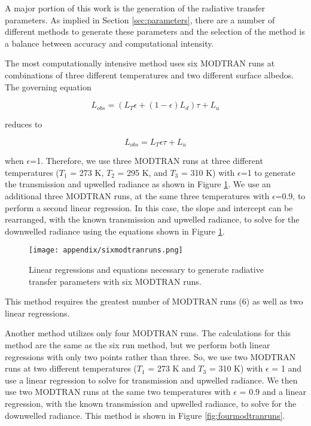 \documentclass{book}
\begin{document}
A major portion of this work is the generation of the radiative transfer parameters.  As implied in Section \ref{sec:parameters}, there are a number of different methods to generate these parameters and the selection of the method is a balance between accuracy and computational intensity.

The most computationally intensive method uses six MODTRAN runs at combinations of three different temperatures and two different surface albedos.  The governing equation 

\[
L_{obs} = (L_T\epsilon+(1-\epsilon)L_d)\tau + L_u
\]

reduces to 

\[
L_{obs} = L_T\epsilon\tau + L_u
\]

when $\epsilon$=1.  Therefore, we use three MODTRAN runs at three different temperatures ($T_1$ = 273 K, $T_2$ =  295 K, and $T_3$ = 310 K) with $\epsilon$=1 to generate the transmission and upwelled radiance as shown in Figure \ref{fig:sixmodtranruns}.  We use an additional three MODTRAN runs, at the same three temperatures with $\epsilon$=0.9, to perform a second linear regression.  In this case, the slope and intercept can be rearranged, with the known transmission and upwelled radiance, to solve for the downwelled radiance using the equations shown in Figure \ref{fig:sixmodtranruns}.  

\begin{figure}[H]
\centering
\texttt{[image: appendix/sixmodtranruns.png]}
\caption{Linear regressions and equations necessary to generate radiative transfer parameters with six MODTRAN runs.}
\label{fig:sixmodtranruns}
\end{figure}

This method requires the greatest number of MODTRAN runs (6) as well as two linear regressions.

Another method utilizes only four MODTRAN runs.  The calculations for this method are the same as the six run method, but we perform both linear regressions with only two points rather than three.  So, we use two MODTRAN runs at two different temperatures ($T_1$ = 273 K and $T_3$ = 310 K) with $\epsilon$ = 1 and use a linear regression to solve for transmission and upwelled radiance.  We then use two MODTRAN runs at the same two temperatures with $\epsilon$ = 0.9 and a linear regression, with the known transmission and upwelled radiance, to solve for the downwelled radiance.  This method is shown in Figure \ref{fig:fourmodtranruns}.
\end{document}

